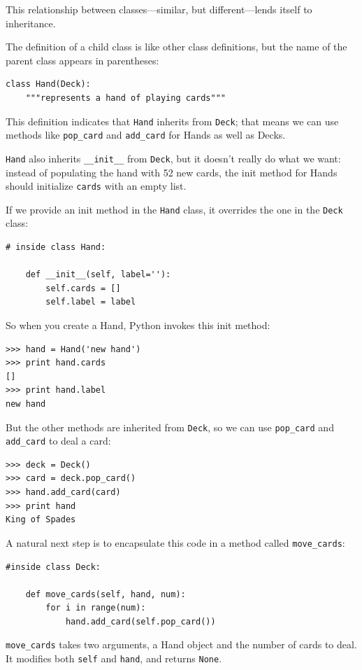 \documentclass[10pt]{book}
\begin{document}
This relationship between classes---similar, but different---lends
itself to inheritance.  

The definition of a child class is like other class definitions,
but the name of the parent class appears in parentheses:


\beforeverb
\begin{verbatim}
class Hand(Deck):
    """represents a hand of playing cards"""
\end{verbatim}
\afterverb
%
This definition indicates that {\tt Hand} inherits from {\tt Deck};
that means we can use methods like \verb"pop_card" and \verb"add_card"
for Hands as well as Decks.

{\tt Hand} also inherits \verb"__init__" from {\tt Deck}, but
it doesn't really do what we want: instead of populating the hand
with 52 new cards, the init method for Hands should initialize
{\tt cards} with an empty list.


If we provide an init method in the {\tt Hand} class, it overrides the
one in the {\tt Deck} class:

\beforeverb
\begin{verbatim}
# inside class Hand:

    def __init__(self, label=''):
        self.cards = []
        self.label = label
\end{verbatim}
\afterverb
%
So when you create a Hand, Python invokes this init method:

\beforeverb
\begin{verbatim}
>>> hand = Hand('new hand')
>>> print hand.cards
[]
>>> print hand.label
new hand
\end{verbatim}
\afterverb
%
But the other methods are inherited from {\tt Deck}, so we can use
\verb"pop_card" and \verb"add_card" to deal a card:

\beforeverb
\begin{verbatim}
>>> deck = Deck()
>>> card = deck.pop_card()
>>> hand.add_card(card)
>>> print hand
King of Spades
\end{verbatim}
\afterverb
%
A natural next step is to encapsulate this code in a method
called \verb"move_cards":


\beforeverb
\begin{verbatim}
#inside class Deck:

    def move_cards(self, hand, num):
        for i in range(num):
            hand.add_card(self.pop_card())
\end{verbatim}
\afterverb
%
\verb"move_cards" takes two arguments, a Hand object and the number of
cards to deal.  It modifies both {\tt self} and {\tt hand}, and
returns {\tt None}.
\end{document}
